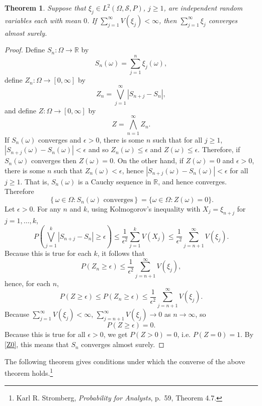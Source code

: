 \documentclass{article}
\newtheorem{theorem}{Theorem}
\theoremstyle{definition}
\begin{document}
\begin{theorem}
Suppose that $\xi_j \in L^2(\Omega,\mathscr{S},P)$, $j \geq 1$, are independent random variables
each with mean $0$. If $\sum_{j=1}^\infty V(\xi_j)<\infty$,
then $\sum_{j=1}^\infty \xi_j$ converges almost surely.
\end{theorem}
\begin{proof}
Define $S_n:\Omega \to \mathbb{R}$ by
\[
S_n(\omega)=\sum_{j=1}^n \xi_j(\omega),
\]
 define
$Z_n:\Omega \to [0,\infty]$ by
\[
Z_n = \bigvee_{j=1}^\infty |S_{n+j}-S_n|,
\]
and define $Z:\Omega \to  [0,\infty]$ by
\[
Z = \bigwedge_{n=1}^\infty Z_n.
\]
If $S_n(\omega)$ converges and $\epsilon>0$,
there is some $n$ such that for all $j \geq 1$,
$|S_{n+j}(\omega)-S_n(\omega)|<\epsilon$ and so
$Z_n(\omega) \leq \epsilon$ and 
$Z(\omega) \leq \epsilon$. Therefore, if
$S_n(\omega)$ converges then $Z(\omega)=0$. On the other hand,
if $Z(\omega)=0$ and $\epsilon>0$, there
is some $n$ such that
$Z_n(\omega)<\epsilon$, hence 
$|S_{n+j}(\omega)-S_n(\omega)| < \epsilon$ for all $j \geq 1$.
That is, $S_n(\omega)$ is a Cauchy sequence in $\mathbb{R}$,
and hence converges. Therefore
\begin{equation}
\left\{\omega \in \Omega: \textrm{$S_n(\omega)$ converges}\right\}=
\{\omega \in \Omega: Z(\omega)=0\}.
\label{Z0}
\end{equation}
Let $\epsilon>0$. For any $n$ and $k$, using Kolmogorov's inequality with
$X_j=\xi_{n+j}$ for $j=1,\ldots,k$,
\[
P\left( \bigvee_{j=1}^k |S_{n+j}-S_n| \geq \epsilon \right)
\leq \frac{1}{\epsilon^2} \sum_{j=1}^k V(X_j)
\leq \frac{1}{\epsilon^2} \sum_{j=n+1}^\infty V(\xi_j).
\]
Because this is true for each $k$, it follows that
\[
P(Z_n \geq \epsilon) \leq \frac{1}{\epsilon^2} \sum_{j=n+1}^\infty V(\xi_j),
\]
hence, for each $n$,
\[
P(Z \geq \epsilon) \leq P(Z_n \geq \epsilon) \leq \frac{1}{\epsilon^2} \sum_{j=n+1}^\infty V(\xi_j).
\]
Because $\sum_{j=1}^\infty V(\xi_j)<\infty$, $\sum_{j=n+1}^\infty V(\xi_j) \to 0$ as $n \to \infty$, so
\[
P(Z \geq \epsilon)=0.
\]
Because this is true for all $\epsilon>0$, we get $P(Z>0)=0$, i.e. $P(Z=0)=1$. By \eqref{Z0},
this means that $S_n$ converges almost surely.
\end{proof}


The following theorem gives conditions under which the converse of the above theorem
holds.\footnote{Karl R. Stromberg, {\em Probability for Analysts}, p.~59, Theorem 4.7.}
\end{document}
